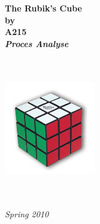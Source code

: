 \documentclass[a4paper]{article}
\begin{document}
\thispagestyle{empty}
\begin{center}        %
  \vspace{5mm}          %
  \LARGE
  \textbf{The Rubik's Cube} \\
  \Large
  \vspace{5mm}
  \textbf{by} \\
  \vspace{5mm}
  \large
  \textbf{A215} \\
  \vspace{10mm}
  \Large
  {\bf{\textsl{Proces Analyse}}} \\
   \vspace{2mm}
  {\bf{\textsl{}}} \\
  \vspace{5mm}
  {\large \textsl {}}\\
  
  
  \vspace{10mm}
  \centerline{\includegraphics[width=4cm,height=4cm]{../rapport/input/pics/rubiksCube}}
  \vspace{5mm}
  \textsl{} \\
  \textsl{} \\
  \vspace{10mm}
  \large
  \textsl{Spring 2010} \\
  \vspace{5mm}
  \normalsize
  \textsl{} \\
  \textsl{} \\
\end{center}

\ \pagebreak{}
\tableofcontents{}
\ \pagebreak{}

\pagebreak

\pagebreak

\pagebreak

\end{document}
